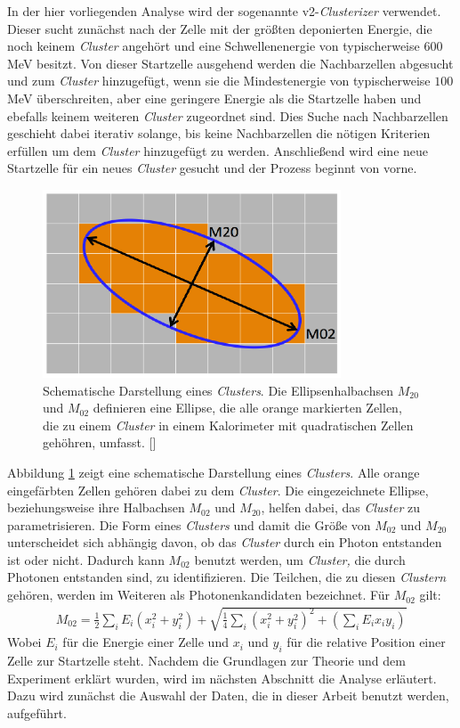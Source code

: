 In der hier vorliegenden Analyse wird der sogenannte v2-\textit{Clusterizer} verwendet.
Dieser sucht zun\"achst nach der Zelle mit der gr\"o{\ss}ten deponierten Energie, die noch keinem \textit{Cluster} angeh\"ort und eine Schwellenenergie von typischerweise $600$ MeV besitzt.
Von dieser Startzelle ausgehend werden die Nachbarzellen abgesucht und zum \textit{Cluster} hinzugef\"ugt, wenn sie die Mindestenergie von typischerweise $100$ MeV \"uberschreiten, aber eine geringere Energie als die Startzelle haben und ebefalls keinem weiteren \textit{Cluster} zugeordnet sind.
Dies Suche nach Nachbarzellen geschieht dabei iterativ solange, bis keine Nachbarzellen die n\"otigen Kriterien erf\"ullen um dem \textit{Cluster} hinzugef\"ugt zu werden.
Anschlie{\ss}end wird eine neue Startzelle f\"ur ein neues \textit{Cluster} gesucht und der Prozess beginnt von vorne.
\begin{figure}[t!]
\centering
\includegraphics[width=.35\linewidth]{m02&m20.png}
\caption{Schematische Darstellung eines \textit{Clusters}. Die Ellipsenhalbachsen $M_{20}$ und $M_{02}$ definieren eine Ellipse, die alle orange markierten Zellen, die zu einem \textit{Cluster} in einem Kalorimeter mit quadratischen Zellen geh\"ohren, umfasst.
[\cite{thesis:Adrian}]}
\label{fig:$M_{20}$}
\end{figure}
Abbildung \ref{fig:$M_{20}$} zeigt eine schematische Darstellung eines \textit{Clusters}.
Alle orange eingef\"arbten Zellen geh\"oren dabei zu dem \textit{Cluster}.
Die eingezeichnete Ellipse, beziehungsweise ihre Halbachsen $M_{02}$ und $M_{20}$, helfen dabei, das \textit{Cluster} zu parametrisieren.
Die Form eines \textit{Clusters} und damit die Gr\"o{\ss}e von $M_{02}$ und $M_{20}$ unterscheidet sich abh\"angig davon, ob das \textit{Cluster} durch ein Photon entstanden ist oder nicht.
Dadurch kann $M_{02}$ benutzt werden, um \textit{Cluster,} die durch Photonen entstanden sind, zu identifizieren.
Die Teilchen, die zu diesen \textit{Clustern} geh\"oren, werden im Weiteren als Photonenkandidaten bezeichnet.
F\"ur $M_{02}$ gilt:
\begin{align} 
M_{02} = \frac{1}{2}\sum_{i}E_{i}(x_{i}^{2}+y_{i}^{2})+\sqrt{\frac{1}{4}\sum_{i}\left(x_{i}^{2}+y_{i}^{2}\right)^{2}+\left(\sum_{i}E_{i}x_{i}y_{i}\right)}
\end{align}
Wobei $E_{i}$ f\"ur die Energie einer Zelle und $x_{i}$ und $y_{i}$ f\"ur die relative Position einer Zelle zur Startzelle steht.
\newline
Nachdem die Grundlagen zur Theorie und dem Experiment erkl\"art wurden, wird im n\"achsten Abschnitt die Analyse erl\"autert.
Dazu wird zun\"achst die Auswahl der Daten, die in dieser Arbeit benutzt werden, aufgef\"uhrt.
